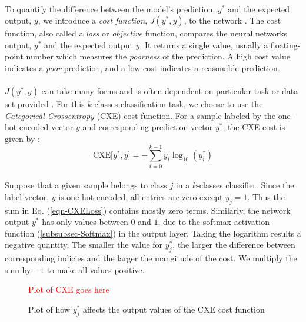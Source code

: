 \documentclass[12pt,letterpaper]{article}
\begin{document}
\paragraph*{}To quantify the difference between the model's prediction, $y^*$ and the expected output, $y$, we introduce a \textit{cost function}, $J(y^*,y)$, to the network \cite{Goodfellow,James}. The cost function, also called a \textit{loss} or \textit{objective} function, compares the neural networks output, $y^*$ and the expected output $y$. It returns a single value, usually a floating-point number which measures the \textit{poorness} of the prediction. A high cost value indicates a \textit{poor} prediction, and a low cost indicates a reasonable prediction. 

\paragraph*{}$J(y^*,y)$ can take many forms and is often dependent on particular task or data set provided \cite{James}. For this $k$-classes classification task, we choose to use the \textit{Categorical Crossentropy} (CXE) cost function. For a sample labeled by the one-hot-encoded vector $y$ and corresponding prediction vector $y^*$, the CXE cost is given by \cite{Goodfellow,Virtanen}:
\begin{equation}
\label{eqn-CXELoss}
\text{CXE}\big[ y^* , y \big] = - \sum_{i=0}^{k-1} y_i \log_{10}(y^*_i) 
\end{equation}

\paragraph*{}Suppose that a given sample belongs to class $j$ in a $k$-classes classifier. Since the label vector, $y$ is one-hot-encoded, all entries are zero except $y_{j} = 1$. Thus the sum in Eq. (\ref{eqn-CXELoss}) contains mostly zero terms. Similarly, the network output $y^*$ has only values between $0$ and $1$, due to the softmax activation function (\ref{subsubsec-Softmax}) in the output layer. Taking the logarithm results a negative quantity. The smaller the value for $y^*_j$, the larger the difference between corresponding indicies and the larger the mangitude of the cost. We multiply the sum by $-1$ to make all values positive.  

\begin{figure}[h]
\begin{center}
\textcolor{red}{Plot of CXE goes here}
\end{center}
\caption{Plot of how $y^*_{j}$ affects the output values of the CXE cost function}
\label{fig-CXELoss}
\end{figure}
\end{document}
